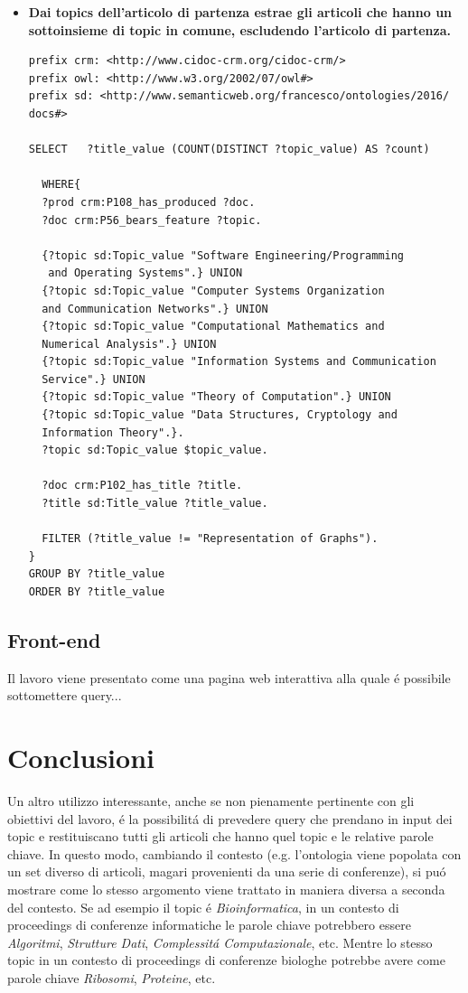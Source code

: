 \documentclass[11pt,a4paper]{article}
\begin{document}
\begin{itemize}
\item \textbf{Dai topics dell'articolo di partenza estrae gli articoli che hanno un sottoinsieme di topic in comune, escludendo l'articolo di partenza.}
\begin{lstlisting}
prefix crm: <http://www.cidoc-crm.org/cidoc-crm/>
prefix owl: <http://www.w3.org/2002/07/owl#>
prefix sd: <http://www.semanticweb.org/francesco/ontologies/2016/
docs#>

SELECT   ?title_value (COUNT(DISTINCT ?topic_value) AS ?count) 
 
  WHERE{
  ?prod crm:P108_has_produced ?doc.
  ?doc crm:P56_bears_feature ?topic.

  {?topic sd:Topic_value "Software Engineering/Programming
   and Operating Systems".} UNION
  {?topic sd:Topic_value "Computer Systems Organization 
  and Communication Networks".} UNION
  {?topic sd:Topic_value "Computational Mathematics and 
  Numerical Analysis".} UNION
  {?topic sd:Topic_value "Information Systems and Communication 
  Service".} UNION
  {?topic sd:Topic_value "Theory of Computation".} UNION
  {?topic sd:Topic_value "Data Structures, Cryptology and 
  Information Theory".}.
  ?topic sd:Topic_value $topic_value.

  ?doc crm:P102_has_title ?title.
  ?title sd:Title_value ?title_value.
 
  FILTER (?title_value != "Representation of Graphs").
}
GROUP BY ?title_value
ORDER BY ?title_value
\end{lstlisting}
\end{itemize}

\subsection{Front-end}
Il lavoro viene presentato come una pagina web interattiva alla quale \'e possibile sottomettere query...

\section{Conclusioni}
\label{sec:conclusions}
Un altro utilizzo interessante, anche se non pienamente pertinente con gli obiettivi del lavoro, \'e la possibilit\'a di prevedere query che prendano in input dei topic e restituiscano tutti gli articoli che hanno quel topic e le relative parole chiave. In questo modo, cambiando il contesto (e.g. l'ontologia viene popolata con un set diverso di articoli, magari provenienti da una serie di conferenze), si pu\'o mostrare come lo stesso argomento viene trattato in maniera diversa a seconda del contesto. Se ad esempio il topic \'e \emph{Bioinformatica}, in un contesto di proceedings di conferenze informatiche le parole chiave potrebbero essere \emph{Algoritmi}, \emph{Strutture Dati}, \emph{Complessit\'a Computazionale}, etc. Mentre lo stesso topic in un contesto di proceedings di conferenze biologhe potrebbe avere come parole chiave \emph{Ribosomi}, \emph{Proteine}, etc. 
\end{document}
